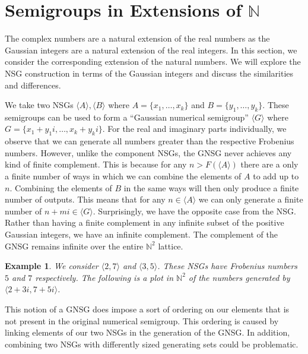 \documentclass[11pt]{amsart}
\theoremstyle{plain}
\newtheorem{exa}{Example}
\theoremstyle{definition}
\begin{document}
\section{Semigroups in Extensions of $\mathbb{N}$}
The complex numbers are a natural extension of the real numbers as the Gaussian integers are a natural extension of the real integers.
In this section, we consider the corresponding extension of the natural numbers.
We will explore the NSG construction in terms of the Gaussian integers and discuss the similarities and differences.

We take two NSGs $\langle A\rangle, \langle B\rangle$ where $A=\{x_1,\dots,x_k\}$ and $B=\{y_1,\dots,y_k\}$.
These semigroups can be used to form a ``Gaussian numerical semigroup'' $\langle G\rangle$ where $G=\{x_1+y_1i,\dots,x_k+y_ki\}$.
For the real and imaginary parts individually,
we observe that we can generate all numbers greater than the respective Frobenius numbers.
However, unlike the component NSGs, the GNSG never achieves any kind of finite complement.
This is because for any $n>F(\langle A\rangle)$ there are a only a finite number of ways in which we can combine the elements of $A$ to add up to $n$.
Combining the elements of $B$ in the same ways will then only produce a finite number of outputs.
This means that for any $n\in \langle A\rangle$ we can only generate a finite number of $n+mi\in \langle G\rangle$.
Surprisingly, we have the opposite case from the NSG.
Rather than having a finite complement in any infinite subset of the positive Gaussian integers, we have an infinite complement.
The complement of the GNSG remains infinite over the entire $\mathbb{N}^2$ lattice.

\begin{exa}
We consider $\langle 2,7\rangle$ and $\langle 3,5\rangle$. These NSGs have Frobenius numbers $5$ and $7$ respectively\cite{frobmask}. The following is a plot in $\mathbb{N}^2$ of the numbers generated by $\langle 2+3i,7+5i\rangle$.

\begin{center}
\end{center}
\end{exa}
This notion of a GNSG does impose a sort of ordering on our elements that is not present in the original numerical semigroup. This ordering is caused by linking elements of our two NSGs in the generation of the GNSG. In addition, combining two NSGs with differently sized generating sets could be problematic.
\end{document}

